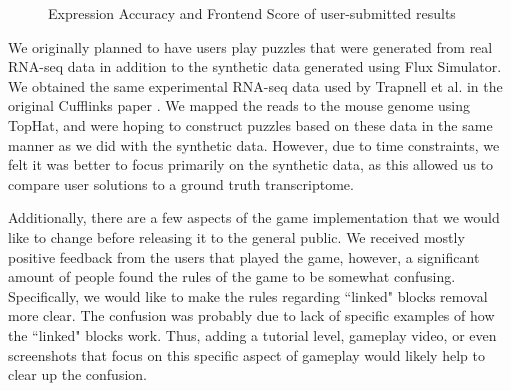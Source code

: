 \documentclass[12pt]{article}
\begin{document}
\begin{figure}[H]
\centering
{}
\caption{Expression Accuracy and Frontend Score of user-submitted results}\label{fig:score}
\end{figure}

We originally planned to have users play puzzles that were generated from real RNA-seq data in addition to the synthetic data generated using Flux Simulator.
We obtained the same experimental RNA-seq data used by Trapnell et al. in the original Cufflinks paper \citep{trapnell2010transcript}. We mapped the reads to 
the mouse genome using TopHat, and were hoping to construct puzzles based on these data in the same manner as we did with the synthetic data. However, due
to time constraints, we felt it was better to focus primarily on the synthetic data, as this allowed us to compare user solutions to a ground truth transcriptome.

Additionally, there are a few aspects of the game implementation that we would like to change before releasing it to the general public. We received mostly
positive feedback from the users that played the game, however, a significant amount of people found the rules of the game to be somewhat confusing. Specifically,
we would like to make the rules regarding ``linked" blocks removal more clear. The confusion was probably due to lack of specific examples of how the ``linked" blocks
work. Thus, adding a tutorial level, gameplay video, or even screenshots that focus on this specific aspect of gameplay would likely help to clear up the confusion.
\end{document}
